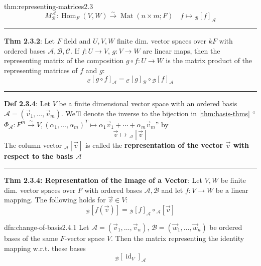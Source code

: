 \documentclass[landscape, 8pt]{extarticle}
\DeclareMathOperator{\Mat}{Mat}
\DeclareMathOperator{\Hom}{Hom}
\DeclareMathOperator{\id}{id}
\begin{document}
\begin{multicols}{3}
\begin{thm}{thm:representing-matrices}{2.3}
    \vspace{-10pt}
    \[M^{\mathcal{A}}_{\mathcal{B}} : \Hom_{F}(V, W) \xrightarrow{\sim} \Mat(n \times m; F) \quad f \mapsto {}_{\mathcal{B}}[f]_{\mathcal{A}}\]

    \vspace{-5pt}
    \noindent\rule{\textwidth}{0.2pt}
    \textbf{Thm 2.3.2}: Let $F$ field and $U,V,W$ finite dim. vector spaces over $kF$ with ordered bases $\mathcal{A}, \mathcal{B}, \mathcal{C}$. If $f : U \to V$, $g : V \to W$ are linear maps, then the representing matrix of the composition $g \circ f : U \to W$ is the matrix product of the representing matrices of $f$ and $g$:
    \[{}_{\mathcal{C}}[g \circ f]_{\mathcal{A}} = {}_{\mathcal{C}}[g]_{\mathcal{B}} \circ {}_{\mathcal{B}}[f]_{\mathcal{A}}\]

    \vspace{-5pt}
    \noindent\rule{\textwidth}{0.2pt}

    \textbf{Def 2.3.4}: Let $V$ be a finite dimensional vector space with an ordered basis $\mathcal{A} = (\vec{v}_{1},\dots,\vec{v}_{m})$. We'll denote the inverse to the bijection in \ref{thm:basis-thms} ``$\Phi_{\mathcal{A}} : F^{m} \xrightarrow{\sim} V, (\alpha_{1},\dots,\alpha_{m})^{T} \mapsto \alpha_{1}\vec{v}_{1} +\cdots + \alpha_{m}\vec{v}_{m}$'' by
    \[\vec{v} \mapsto {}_{\mathcal{A}}[\vec{v}]\]
    The column vector ${}_{\mathcal{A}}[\vec{v}]$ is called the \textbf{representation of the vector $\vec{v}$ with respect to the basis $\mathcal{A}$}

    \vspace{-5pt}
    \noindent\rule{\textwidth}{0.2pt}

    \textbf{Thm 2.3.4: Representation of the Image of a Vector}: Let $V,W$ be finite dim. vector spaces over $F$ with ordered bases $\mathcal{A}, \mathcal{B}$ and let $f : V \to W$ be a linear mapping. The following holds for $\vec{v}\in V$:
    \[{}_{\mathcal{B}}[f(\vec{v})] = {}_{\mathcal{B}}[f]_{\mathcal{A}}\circ {}_{\mathcal{A}}[\vec{v}]\]
\end{thm}

\vspace{-5pt}

\begin{dfn}{dfn:change-of-basis}{2.4.1}
    \vspace{-5pt}
    Let $\mathcal{A} = (\vec{v}_{1},\dots,\vec{v}_{n})$, $\mathcal{B} = (\vec{w}_{1},\dots,\vec{w}_{n})$ be ordered bases of the same $F$-vector space $V$. Then the matrix representing the identity mapping w.r.t. these bases
    \[{}_{\mathcal{B}}[\id_{V}]_{\mathcal{A}}\]


\end{dfn}
\end{multicols}
\end{document}
